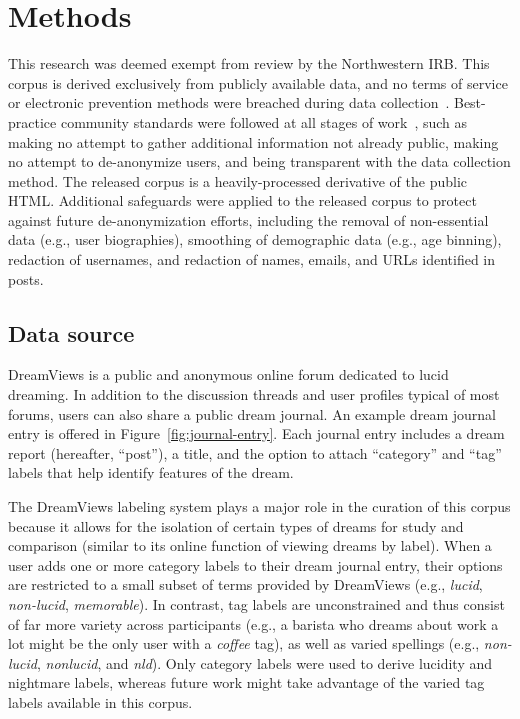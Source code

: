 \documentclass[10pt,a4paper,twocolumn]{article}
\begin{document}
\section{Methods}\label{sec:methods}

This research was deemed exempt from review by the Northwestern IRB. This corpus is derived exclusively from publicly available data, and no terms of service or electronic prevention methods were breached during data collection~\cite{boegershausen2021,krotov2018,krotov2020,gold2017}. Best-practice community standards were followed at all stages of work~\cite{rivers2014,zook2017,franzke2020}, such as making no attempt to gather additional information not already public, making no attempt to de-anonymize users, and being transparent with the data collection method. The released corpus is a heavily-processed derivative of the public HTML. Additional safeguards were applied to the released corpus to protect against future de-anonymization efforts, including the removal of non-essential data (e.g., user biographies), smoothing of demographic data (e.g., age binning), redaction of usernames, and redaction of names, emails, and URLs identified in posts.

\subsection{Data source}\label{sec:data-source}

DreamViews is a public and anonymous online forum dedicated to lucid dreaming. In addition to the discussion threads and user profiles typical of most forums, users can also share a public dream journal. An example dream journal entry is offered in Figure~\ref{fig:journal-entry}. Each journal entry includes a dream report (hereafter, ``post''), a title, and the option to attach ``category'' and ``tag'' labels that help identify features of the dream.

\par
The DreamViews labeling system plays a major role in the curation of this corpus because it allows for the isolation of certain types of dreams for study and comparison (similar to its online function of viewing dreams by label). When a user adds one or more category labels to their dream journal entry, their options are restricted to a small subset of terms provided by DreamViews (e.g., \emph{lucid}, \emph{non-lucid}, \emph{memorable}). In contrast, tag labels are unconstrained and thus consist of far more variety across participants (e.g., a barista who dreams about work a lot might be the only user with a \emph{coffee} tag), as well as varied spellings (e.g., \emph{non-lucid}, \emph{nonlucid}, and \emph{nld}). Only category labels were used to derive lucidity and nightmare labels, whereas future work might take advantage of the varied tag labels available in this corpus.
\end{document}
